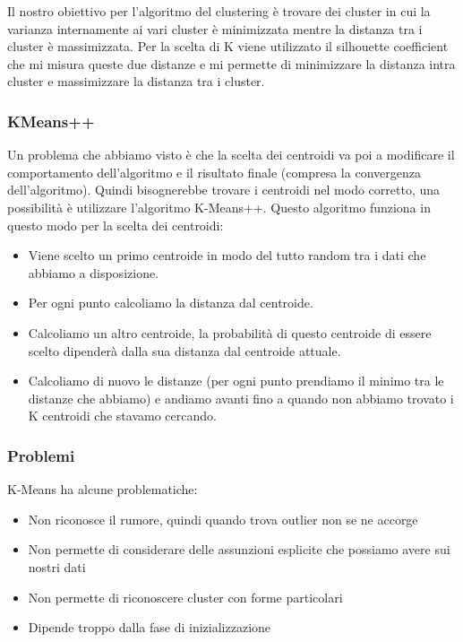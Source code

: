 \documentclass[14pt]{extreport}
\begin{document}
Il nostro obiettivo per l'algoritmo del clustering è trovare dei cluster in cui la varianza internamente ai vari cluster è minimizzata mentre la distanza tra 
i cluster è massimizzata.
Per la scelta di K viene utilizzato il silhouette coefficient che mi misura queste due distanze e mi permette di minimizzare la distanza intra cluster e massimizzare
la distanza tra i cluster.

\subsubsection{KMeans++}

Un problema che abbiamo visto è che la scelta dei centroidi va poi a modificare il comportamento dell'algoritmo e il risultato finale (compresa la 
convergenza dell'algoritmo). Quindi bisognerebbe trovare i centroidi nel modo corretto, una possibilità è utilizzare l'algoritmo K-Means++.
Questo algoritmo funziona in questo modo per la scelta dei centroidi:
\begin{itemize}
\item Viene scelto un primo centroide in modo del tutto random tra i dati che abbiamo a disposizione.
\item Per ogni punto calcoliamo la distanza dal centroide.
\item Calcoliamo un altro centroide, la probabilità di questo centroide di essere scelto dipenderà dalla sua distanza dal centroide attuale.
\item Calcoliamo di nuovo le distanze (per ogni punto prendiamo il minimo tra le distanze che abbiamo) e andiamo avanti fino a quando non abbiamo trovato 
i K centroidi che stavamo cercando.
\end{itemize}

\subsubsection{Problemi}

K-Means ha alcune problematiche:
\begin{itemize}
\item Non riconosce il rumore, quindi quando trova outlier non se ne accorge
\item Non permette di considerare delle assunzioni esplicite che possiamo avere sui nostri dati
\item Non permette di riconoscere cluster con forme particolari 
\item Dipende troppo dalla fase di inizializzazione 
\end{itemize}
\end{document}
